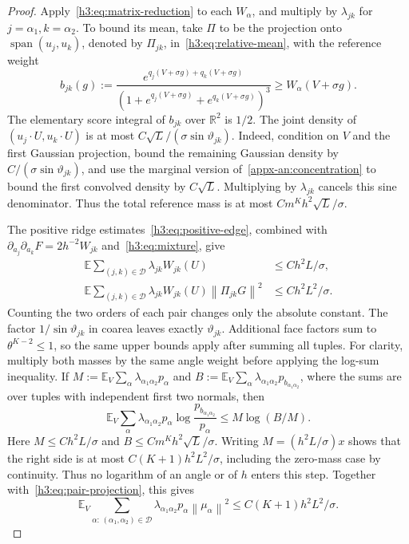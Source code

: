 \documentclass[11pt,letterpaper]{article}
\theoremstyle{remark}
\newcommand{\E}{\mathbb E}
\newcommand{\R}{\mathbb R}
\newcommand{\cD}{\mathcal D}
\newcommand{\norm}[1]{\left\lVert#1\right\rVert}
\begin{document}
\begin{proof}
Apply~\eqref{h3:eq:matrix-reduction} to each $W_\alpha$, and multiply
by $\lambda_{jk}$ for $j=\alpha_1,k=\alpha_2$.
To bound its mean, take $\Pi$ to be the projection onto
$\operatorname{span}(u_j,u_k)$, denoted by $\Pi_{jk}$,
in~\eqref{h3:eq:relative-mean}, with the reference weight
\[
 b_{jk}(g):=\frac{e^{q_j(V+\sigma g)+q_k(V+\sigma g)}}
                  {(1+e^{q_j(V+\sigma g)}+e^{q_k(V+\sigma g)})^3}
                  \ge W_\alpha(V+\sigma g).
\]
The elementary score integral of $b_{jk}$ over $\R^2$ is $1/2$.
The joint density of $(u_j\cdot U,u_k\cdot U)$ is at most
$C\sqrt L/(\sigma\sin\vartheta_{jk})$.
Indeed, condition on $V$ and the first Gaussian projection, bound the
remaining Gaussian density by $C/(\sigma\sin\vartheta_{jk})$, and use
the marginal version of~\eqref{appx-an:concentration} to bound the first
convolved density by $C\sqrt L$.
Multiplying by $\lambda_{jk}$ cancels this sine denominator.
Thus the total reference mass is at most $Cm^Kh^2\sqrt L/\sigma$.

The positive ridge estimates~\eqref{h3:eq:positive-edge}, combined with
$\partial_{a_j}\partial_{a_k}F=2h^{-2}W_{jk}$ and~\eqref{h3:eq:mixture}, give
\begin{align}
 \E\sum_{(j,k)\in\cD}\lambda_{jk}W_{jk}(U)
   &\le C h^2L/\sigma,\label{h3:eq:pair-mass}\\
 \E\sum_{(j,k)\in\cD}\lambda_{jk}W_{jk}(U)\norm{\Pi_{jk}G}^2
   &\le C h^2L^2/\sigma.\label{h3:eq:pair-projection}
\end{align}
Counting the two orders of each pair changes only the absolute constant.
The factor $1/\sin\vartheta_{jk}$ in coarea leaves exactly
$\vartheta_{jk}$. Additional face factors sum to $\theta^{K-2}\le1$,
so the same upper bounds apply after summing all tuples.
For clarity, multiply both masses by the same angle weight before
applying the log-sum inequality. If
$M:=\E_V\sum_\alpha\lambda_{\alpha_1\alpha_2}p_\alpha$ and
$B:=\E_V\sum_\alpha\lambda_{\alpha_1\alpha_2}p_{b_{\alpha_1\alpha_2}}$,
where the sums are over tuples with independent first two normals, then
\[
 \E_V\sum_\alpha\lambda_{\alpha_1\alpha_2}p_\alpha
       \log\frac{p_{b_{\alpha_1\alpha_2}}}{p_\alpha}
 \le M\log(B/M).
\]
Here $M\le Ch^2L/\sigma$ and $B\le Cm^Kh^2\sqrt L/\sigma$.
Writing $M=(h^2L/\sigma)x$ shows that the right side is at most
$C(K+1)h^2L^2/\sigma$, including the zero-mass case by continuity.
Thus no logarithm of an angle or of $h$ enters this step.
Together with~\eqref{h3:eq:pair-projection}, this gives
\begin{equation}
 \E_V\sum_{\alpha:\,(\alpha_1,\alpha_2)\in\cD}
 \lambda_{\alpha_1\alpha_2}p_\alpha\norm{\mu_\alpha}^2
 \le C(K+1)h^2L^2/\sigma.
 \label{h3:eq:pair-means}
\end{equation}


\end{proof}
\end{document}

